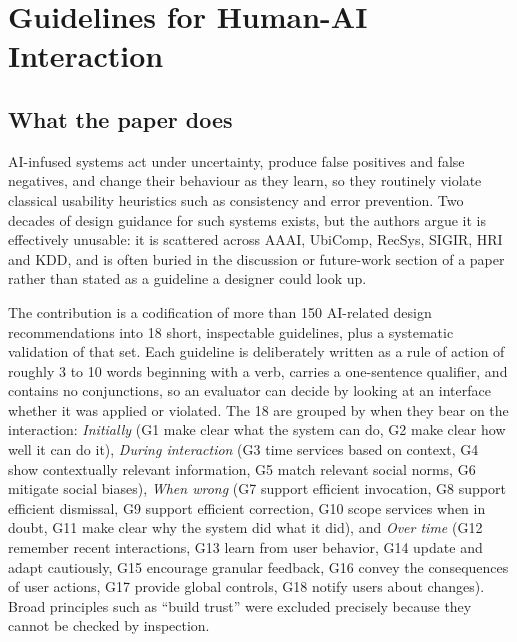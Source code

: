 \section{Guidelines for Human-AI Interaction}

\subsection{What the paper does}

AI-infused systems act under uncertainty, produce false positives and false negatives, and change their behaviour as they learn, so they routinely violate classical usability heuristics such as consistency and error prevention. Two decades of design guidance for such systems exists, but the authors argue it is effectively unusable: it is scattered across AAAI, UbiComp, RecSys, SIGIR, HRI and KDD, and is often buried in the discussion or future-work section of a paper rather than stated as a guideline a designer could look up.

The contribution is a codification of more than 150 AI-related design recommendations into 18 short, inspectable guidelines, plus a systematic validation of that set. Each guideline is deliberately written as a rule of action of roughly 3 to 10 words beginning with a verb, carries a one-sentence qualifier, and contains no conjunctions, so an evaluator can decide by looking at an interface whether it was applied or violated. The 18 are grouped by when they bear on the interaction: \emph{Initially} (G1 make clear what the system can do, G2 make clear how well it can do it), \emph{During interaction} (G3 time services based on context, G4 show contextually relevant information, G5 match relevant social norms, G6 mitigate social biases), \emph{When wrong} (G7 support efficient invocation, G8 support efficient dismissal, G9 support efficient correction, G10 scope services when in doubt, G11 make clear why the system did what it did), and \emph{Over time} (G12 remember recent interactions, G13 learn from user behavior, G14 update and adapt cautiously, G15 encourage granular feedback, G16 convey the consequences of user actions, G17 provide global controls, G18 notify users about changes). Broad principles such as ``build trust'' were excluded precisely because they cannot be checked by inspection.

